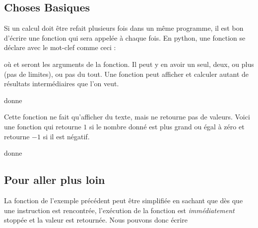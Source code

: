 \subsection{Choses Basiques}

Si un calcul doit être refait plusieurs fois dans un même programme, il est bon d'écrire une fonction qui sera appelée à chaque fois. En python, une fonction se déclare avec le mot-clef  comme ceci :
\begin{quote}
\end{quote}
où  et  seront les arguments de la fonction. Il peut y en avoir un seul, deux, ou plus (pas de limites), ou pas du tout. Une fonction peut afficher et calculer autant de résultats intermédiaires que l'on veut. 



donne



Cette fonction ne fait qu'afficher du texte, mais ne retourne pas de valeurs. Voici une fonction qui retourne \( 1\) si le nombre donné est plus grand ou égal à zéro et retourne \( -1\) si il est négatif.




donne







\subsection{Pour aller plus loin}

La fonction de l'exemple précédent peut être simplifiée en sachant que dès que une instruction  est rencontrée, l'exécution de la fonction est \emph{immédiatement} stoppée et la valeur est retournée. Nous pouvons donc écrire

